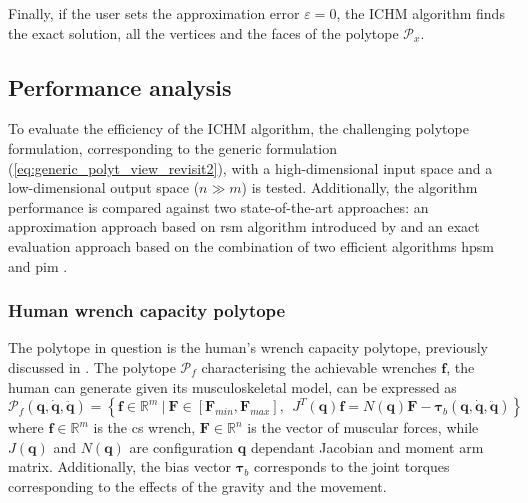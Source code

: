 Finally, if the user sets the approximation error $\varepsilon\!=\!0$, the ICHM algorithm finds the exact solution, all the vertices and the faces of the polytope $\mathcal{P}_x$.

\subsection{Performance analysis}
\label{ch:chm_performance}

To evaluate the efficiency of the ICHM algorithm, the challenging polytope formulation, corresponding to the generic formulation (\ref{eq:generic_polyt_view_revisit2}), with a high-dimensional input space and a low-dimensional output space ($n\gg m$) is tested. Additionally, the algorithm performance is compared against two state-of-the-art approaches: an approximation approach based on \gls{rsm} algorithm introduced by \citet{carmichael_towards_2011} and an exact evaluation approach based on the combination of two efficient algorithms \gls{hpsm} \cite{hyper_psm} and \gls{pim} \cite{bremner_fukuda_marzetta_1998}.

\subsubsection{Human wrench capacity polytope}
The polytope in question is the human's wrench capacity polytope, previously discussed in . The polytope $\mathcal{P}_f$ characterising the achievable wrenches $\bm{f}$, the human can generate given its musculoskeletal model, can be expressed as 
\begin{equation}
    \mathcal{P}_f(\bm{q},\dot{\bm{q}},\ddot{\bm{q}}) = \left\{ \bm{f} \in \mathbb{R}^m ~|~ \bm{F}\in\left[\bm{F}_{min}, \bm{F}_{max} \right], ~~ \!J^T(\bm{q})\bm{f} =\! N(\bm{q})\bm{F} -\bm{\tau}_b(\bm{q},\dot{\bm{q}},\ddot{\bm{q}}) \right\}
    \label{eq:human_force_poly_revisit2}
\end{equation}
where $\bm{f}\in\mathbb{R}^m$ is the \gls{cs} wrench, $\bm{F}\in\mathbb{R}^n$ is the vector of muscular forces, while $J(\bm{q})$ and $N(\bm{q})$ are configuration $\bm{q}$ dependant Jacobian and moment arm matrix. Additionally, the bias vector $\bm{\tau}_b$ corresponds to the joint torques corresponding to the effects of the gravity and the movement. 


